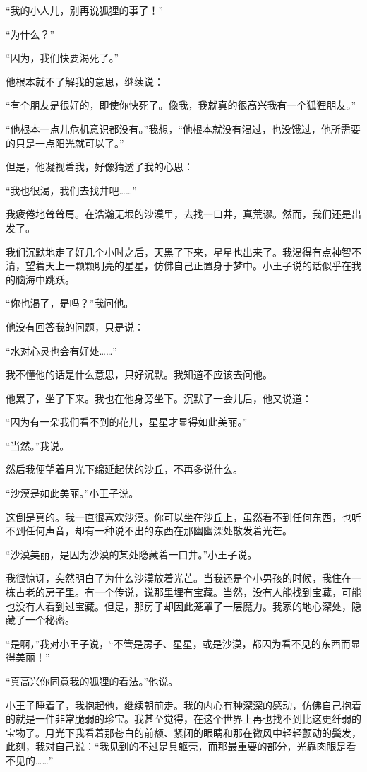 “我的小人儿，别再说狐狸的事了！”

“为什么？”

“因为，我们快要渴死了。”

他根本就不了解我的意思，继续说：

“有个朋友是很好的，即使你快死了。像我，我就真的很高兴我有一个狐狸朋友。”

“他根本一点儿危机意识都没有。”我想，“他根本就没有渴过，也没饿过，他所需要的只是一点阳光就可以了。”

但是，他凝视着我，好像猜透了我的心思：

“我也很渴，我们去找井吧\ldots{}\ldots{}”

我疲倦地耸耸肩。在浩瀚无垠的沙漠里，去找一口井，真荒谬。然而，我们还是出发了。

我们沉默地走了好几个小时之后，天黑了下来，星星也出来了。我渴得有点神智不清，望着天上一颗颗明亮的星星，仿佛自己正置身于梦中。小王子说的话似乎在我的脑海中跳跃。

“你也渴了，是吗？”我问他。

他没有回答我的问题，只是说：

“水对心灵也会有好处\ldots{}\ldots{}”

我不懂他的话是什么意思，只好沉默。我知道不应该去问他。

他累了，坐了下来。我也在他身旁坐下。沉默了一会儿后，他又说道：

“因为有一朵我们看不到的花儿，星星才显得如此美丽。”

“当然。”我说。

然后我便望着月光下绵延起伏的沙丘，不再多说什么。

“沙漠是如此美丽。”小王子说。

这倒是真的。我一直很喜欢沙漠。你可以坐在沙丘上，虽然看不到任何东西，也听不到任何声音，却有一种说不出的东西在那幽幽深处散发着光芒。

“沙漠美丽，是因为沙漠的某处隐藏着一口井。”小王子说。

我很惊讶，突然明白了为什么沙漠放着光芒。当我还是个小男孩的时候，我住在一栋古老的房子里。有一个传说，说那里埋有宝藏。当然，没有人能找到宝藏，可能也没有人看到过宝藏。但是，那房子却因此笼罩了一层魔力。我家的地心深处，隐藏了一个秘密。

“是啊，”我对小王子说，“不管是房子、星星，或是沙漠，都因为看不见的东西而显得美丽！”

“真高兴你同意我的狐狸的看法。”他说。

小王子睡着了，我抱起他，继续朝前走。我的内心有种深深的感动，仿佛自己抱着的就是一件非常脆弱的珍宝。我甚至觉得，在这个世界上再也找不到比这更纤弱的宝物了。月光下我看着那苍白的前额、紧闭的眼睛和那在微风中轻轻颤动的鬓发，此刻，我对自己说：“我见到的不过是具躯壳，而那最重要的部分，光靠肉眼是看不见的\ldots{}\ldots{}”

